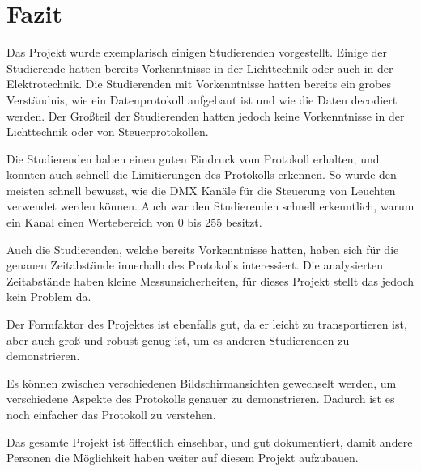 \chapter{Fazit}

Das Projekt wurde exemplarisch einigen Studierenden vorgestellt. Einige der Studierende hatten bereits Vorkenntnisse in der Lichttechnik oder auch in der Elektrotechnik. Die Studierenden mit Vorkenntnisse hatten bereits ein grobes Verständnis, wie ein Datenprotokoll aufgebaut ist und wie die Daten decodiert werden. Der Großteil der Studierenden hatten jedoch keine Vorkenntnisse in der Lichttechnik oder von Steuerprotokollen.

Die Studierenden haben einen guten Eindruck vom Protokoll erhalten, und konnten auch schnell die Limitierungen des Protokolls erkennen. So wurde den meisten schnell bewusst, wie die DMX Kanäle für die Steuerung von Leuchten verwendet werden können. Auch war den Studierenden schnell erkenntlich, warum ein Kanal einen Wertebereich von 0 bis 255 besitzt.

Auch die Studierenden, welche bereits Vorkenntnisse hatten, haben sich für die genauen Zeitabstände innerhalb des Protokolls interessiert. Die analysierten Zeitabstände haben kleine Messunsicherheiten, für dieses Projekt stellt das jedoch kein Problem da.

Der Formfaktor des Projektes ist ebenfalls gut, da er leicht zu transportieren ist, aber auch groß und robust genug ist, um es anderen Studierenden zu demonstrieren.

Es können zwischen verschiedenen Bildschirmansichten gewechselt werden, um verschiedene Aspekte des Protokolls genauer zu demonstrieren. Dadurch ist es noch einfacher das Protokoll zu verstehen.

Das gesamte Projekt ist öffentlich \cite{githubDmxAnalyzer} einsehbar, und gut dokumentiert, damit andere Personen die Möglichkeit haben weiter auf diesem Projekt aufzubauen.

